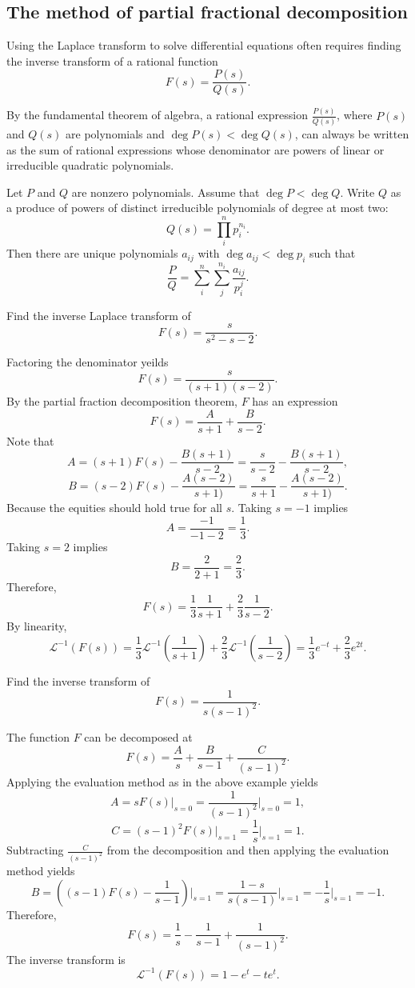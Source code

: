 \subsection*{The method of partial fractional decomposition}

Using the Laplace transform to solve differential equations often requires finding the inverse transform of a rational function
\[F(s)=\frac{P(s)}{Q(s)}.\]

By the fundamental theorem of algebra, a rational expression $\frac{P(s)}{Q(s)}$, where $P(s)$ and $Q(s)$ are polynomials and $\deg P(s)<\deg Q(s)$, can always be written as the sum of rational expressions whose denominator are powers of linear or irreducible quadratic polynomials.

\begin{theorem}
Let $P$ and $Q$ are nonzero polynomials. Assume that $\deg P<\deg Q$. Write $Q$ as a produce of powers of distinct irreducible polynomials of degree at most two:
\[Q(s)=\prod\limits_{i}^n p_i^{n_i}.\]
Then there are unique polynomials $a_{ij}$ with $\deg a_{ij}<\deg p_i$ such that
\[\frac{P}{Q}=\sum\limits_i^n\sum\limits_j^{n_i}\frac{a_{ij}}{p_i^j}.\]
\end{theorem}


\begin{example}
  Find the inverse Laplace transform of
  \[F(s)=\frac{s}{s^2-s-2}.\]
\end{example}
\begin{solution}
  Factoring the denominator yeilds
  \[F(s)=\frac{s}{(s+1)(s-2)}.\]
  By the partial fraction decomposition theorem, $F$ has an expression
  \[F(s)=\frac{A}{s+1}+\frac{B}{s-2}.\]
  Note that 
  \[A=(s+1)F(s)-\frac{B(s+1)}{s-2}=\frac{s}{s-2}-\frac{B(s+1)}{s-2},\]
  \[B=(s-2)F(s)-\frac{A(s-2)}{s+1)}=\frac{s}{s+1}-\frac{A(s-2)}{s+1)}.\]
  Because the equities should hold true for all $s$. Taking $s=-1$ implies \[A=\frac{-1}{-1-2}=\frac13.\]
  Taking $s=2$ implies \[B=\frac{2}{2+1}=\frac23.\]
  Therefore,
  \[F(s)=\frac13\frac{1}{s+1}+\frac23\frac{1}{s-2}.\]
  By linearity,
  \[\mathcal{L}^{-1}(F(s))=\frac13\mathcal{L}^{-1}\left(\frac{1}{s+1}\right)+\frac23\mathcal{L}^{-1}\left(\frac{1}{s-2}\right)=\frac13e^{-t}+\frac23e^{2t}.\]
\end{solution}

\begin{example}
  Find the inverse transform of 
  \[F(s)=\frac{1}{s(s-1)^2}.\]
\end{example}
\begin{solution}
  The function $F$ can be decomposed at
  \[F(s)=\frac{A}{s}+\frac{B}{s-1}+\frac{C}{(s-1)^2}.\]
  Applying the evaluation method as in the above example yields
  \[A=sF(s)\Big|_{s=0}=\frac{1}{(s-1)^2}\Big|_{s=0}=1,\]
  \[C=(s-1)^2F(s)\Big|_{s=1}=\frac{1}{s}\Big|_{s=1}=1.\]
  Subtracting $\frac{C}{(s-1)^2}$ from the decomposition and then applying the evaluation method yields
  \[B=\left((s-1)F(s)-\frac{1}{s-1}\right)\Big|_{s=1}=\frac{1-s}{s(s-1)}\Big|_{s=1}=-\frac1s\Big|_{s=1}=-1.\]
  Therefore,
  \[F(s)=\frac1s-\frac1{s-1}+\frac{1}{(s-1)^2}.\]
  The inverse transform is
  \[\mathcal{L}^{-1}(F(s))=1-e^t-t e^t.\]
\end{solution}

